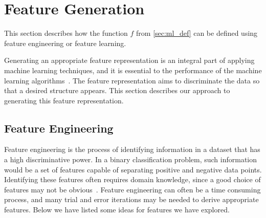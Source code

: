 \section{Feature Generation}\label{sec:feature_generation}
This section describes how the function $f$ from \cref{sec:ml_def} can be defined using feature engineering or feature learning.

Generating an appropriate feature representation is an integral part of applying machine learning techniques, and it is essential to the performance of the machine learning algorithms~\cite{ng-lecture}. The feature representation aims to discriminate the data so that a desired structure appears. This section describes our approach to generating this feature representation.



\subsection{Feature Engineering}
Feature engineering is the process of identifying information in a dataset that has a high discriminative power. In a binary classification problem, such information would be a set of features capable of separating positive and negative data points. Identifying these features often requires domain knowledge, since a good choice of features may not be obvious~\cite{ng-lecture}. Feature engineering can often be a time consuming process, and many trial and error iterations may be needed to derive appropriate features. Below we have listed some ideas for features we have explored.

